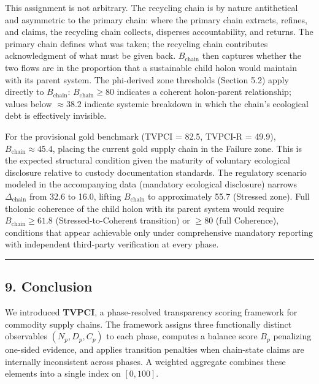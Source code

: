 \documentclass[
  11pt,
  letterpaper,
]{article}
\begin{document}
This assignment is not arbitrary. The recycling chain is by nature
antithetical and asymmetric to the primary chain: where the primary
chain extracts, refines, and claims, the recycling chain collects,
disperses accountability, and returns. The primary chain defines what
was taken; the recycling chain contributes acknowledgment of what must
be given back. \(B_{\text{chain}}\) then captures whether the two flows
are in the proportion that a sustainable child holon would maintain with
its parent system. The phi-derived zone thresholds (Section 5.2) apply
directly to \(B_{\text{chain}}\): \(B_{\text{chain}} \geq 80\) indicates
a coherent holon-parent relationship; values below \(\approx 38.2\)
indicate systemic breakdown in which the chain's ecological debt is
effectively invisible.

For the provisional gold benchmark (TVPCI = 82.5, TVPCI-R = 49.9),
\(B_{\text{chain}} \approx 45.4\), placing the current gold supply chain
in the Failure zone. This is the expected structural condition given the
maturity of voluntary ecological disclosure relative to custody
documentation standards. The regulatory scenario modeled in the
accompanying data (mandatory ecological disclosure) narrows
\(\Delta_{\text{chain}}\) from 32.6 to 16.0, lifting
\(B_{\text{chain}}\) to approximately 55.7 (Stressed zone). Full
tholonic coherence of the child holon with its parent system would
require \(B_{\text{chain}} \geq 61.8\) (Stressed-to-Coherent transition)
or \(\geq 80\) (full Coherence), conditions that appear achievable only
under comprehensive mandatory reporting with independent third-party
verification at every phase.

\begin{center}\rule{0.5\linewidth}{0.5pt}\end{center}

\subsection{9. Conclusion}\label{conclusion}

We introduced \textbf{TVPCI}, a phase-resolved transparency scoring
framework for commodity supply chains. The framework assigns three
functionally distinct observables \((N_p, D_p, C_p)\) to each phase,
computes a balance score \(B_p\) penalizing one-sided evidence, and
applies transition penalties when chain-state claims are internally
inconsistent across phases. A weighted aggregate combines these elements
into a single index on \([0,100]\).
\end{document}
